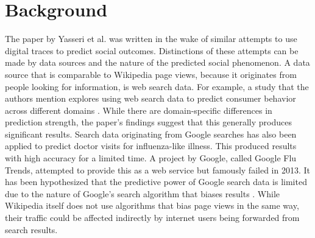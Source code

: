 \chapter{Background}
\label{sec:background}

The paper by Yasseri et al. was written in the wake of similar attempts to use digital traces to predict social outcomes. Distinctions of these attempts can be made by data sources and the nature of the predicted social phenomenon. A data source that is comparable to Wikipedia page views, because it originates from people looking for information, is web search data. For example, a study that the authors mention explores using web search data to predict consumer behavior across different domains \cite{Goel2010Oct}. While there are domain-specific differences in prediction strength, the paper's findings suggest that this generally produces significant results. Search data originating from Google searches has also been applied to predict doctor visits for influenza-like illness. This produced results with high accuracy \cite{Ginsberg2009Feb} for a limited time. A project by Google, called Google Flu Trends, attempted to provide this as a web service but famously failed in 2013. It has been hypothesized that the predictive power of Google search data is limited due to the nature of Google's search algorithm that biases results \cite{Lazer2014Mar}. While Wikipedia itself does not use algorithms that bias page views in the same way, their traffic could be affected indirectly by internet users being forwarded from search results. \par
